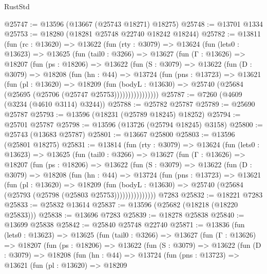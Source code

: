 \begin{lexlean}{RustStd}
\begin{coremodule}
@25747 := @13596 (@13667 (@25743 @18271) @18275)
@25748 := @13701 @1334
@25753 := @18280 (@18281 @25748 @22740 @18242 @18244)
@25782 := @13811
    (fun (rc : @13620) =>
    @13622
      (fun (rty : @3079) =>
      @13624
        (fun (lets0 : @13623) =>
        @13625
          (fun (tail0 : @3266) =>
          @13627
            (fun (Γ : @13626) =>
            @18207
              (fun (ps : @18206) =>
              @13622
                (fun (S : @3079) =>
                @13622
                  (fun (D : @3079) =>
                  @18208
                    (fun (hn : @44) =>
                    @13724
                      (fun (pns : @13723) =>
                      @13621
                        (fun (pl : @13620) =>
                        @18209
                          (fun (bodyL : @13630) =>
                          @25740 (@25684 (@25695 (@25706 (@25747 @25753))))))))))))))))
@25787 := @7260 (@4609 (@3234 (@4610 @3114) @3244))
@25788 := @25782 @25787
@25789 := @25690 @25787
@25793 := @13596 (@18231 (@25789 @18245) @18252)
@25794 := @25701 @25787
@25798 := @13596 (@13726 (@25794 @18245) @3158)
@25800 := @25743 (@13683 @25787)
@25801 := @13667 @25800
@25803 := @13596 (@25801 @18275)
@25831 := @13814
    (fun (rty : @3079) =>
    @13624
      (fun (lets0 : @13623) =>
      @13625
        (fun (tail0 : @3266) =>
        @13627
          (fun (Γ : @13626) =>
          @18207
            (fun (ps : @18206) =>
            @13622
              (fun (S : @3079) =>
              @13622
                (fun (D : @3079) =>
                @18208
                  (fun (hn : @44) =>
                  @13724
                    (fun (pns : @13723) =>
                    @13621
                      (fun (pl : @13620) =>
                      @18209
                        (fun (bodyL : @13630) =>
                        @25740 (@25684 (@25793 (@25798 (@25803 @25753)))))))))))))))
    @7283
@25832 := @18221 @7283
@25833 := @25832 @13614
@25837 := @13596 (@25682 (@18218 (@18220 @25833)))
@25838 := @13696 @7283
@25839 := @18278 @25838
@25840 := @13699 @25838
@25842 := @25840 @25748 @22740
@25871 := @13836
    (fun (lets0 : @13623) =>
    @13625
      (fun (tail0 : @3266) =>
      @13627
        (fun (Γ : @13626) =>
        @18207
          (fun (ps : @18206) =>
          @13622
            (fun (S : @3079) =>
            @13622
              (fun (D : @3079) =>
              @18208
                (fun (hn : @44) =>
                @13724
                  (fun (pns : @13723) =>
                  @13621
                    (fun (pl : @13620) =>
                    @18209

\end{coremodule}
\end{lexlean}
